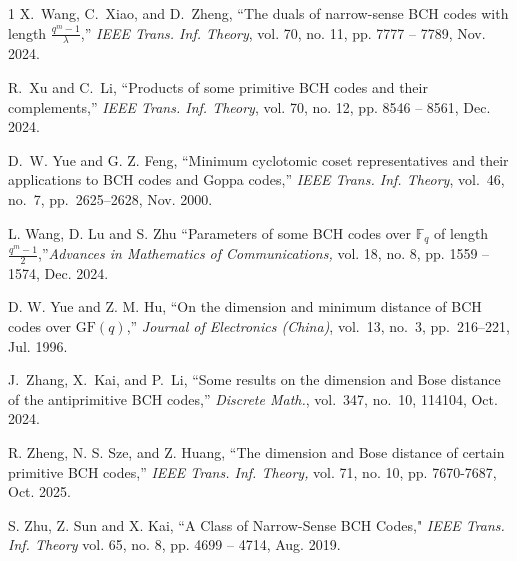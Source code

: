 \documentclass[journal,onecolumn]{IEEEtran}
\begin{document}
\begin{thebibliography}{1}
X.~Wang, C.~Xiao, and D.~Zheng, ``The duals of narrow-sense BCH codes with
  length $\frac{q^ m- 1}{ \lambda}$,'' {\em IEEE Trans. Inf. Theory}, vol. 70, no. 11, pp. 7777 -- 7789,
 Nov.  2024.


R.~Xu and C.~Li, ``Products of some primitive BCH codes and their
  complements,'' {\em IEEE Trans. Inf. Theory}, vol. 70, no. 12, pp. 8546 -- 8561,  Dec. 2024.

 

D.~W. Yue and G. Z. Feng, ``Minimum cyclotomic coset representatives and their
  applications to BCH codes and Goppa codes,'' {\em IEEE Trans. Inf. Theory}, vol.~46, no.~7, pp.~2625--2628, Nov. 2000.




L. Wang, D. Lu and S. Zhu ``Parameters of some BCH codes over $ \mathbb{F}_q $ of length $ \frac{q^m-1}{2} $,''{\em Advances in Mathematics of Communications,} vol. 18, no. 8, pp. 1559 -- 1574, Dec. 2024.





D. W. Yue and Z. M. Hu, ``On the dimension and minimum distance of BCH
  codes over $\mathrm{GF} (q)$,'' {\em Journal of Electronics (China)}, vol.~13, no.~3,
  pp.~216--221, Jul.  1996.

J.~Zhang, X.~Kai, and P.~Li, ``Some results on the dimension and Bose distance
  of the antiprimitive BCH codes,'' {\em Discrete Math.}, vol.~347,
  no.~10, 114104, Oct. 2024.

 R. Zheng, N. S. Sze, and Z. Huang, ``The dimension and Bose distance of certain primitive BCH codes,'' {\em IEEE Trans.  Inf. Theory,} vol. 71, no. 10, pp. 7670-7687, Oct. 2025.




S. Zhu, Z. Sun and X. Kai, ``A Class of Narrow-Sense BCH Codes,"  {\em IEEE Trans. Inf. Theory} vol. 65, no. 8, pp. 4699 -- 4714, Aug. 2019.


\end{thebibliography}
\end{document}
